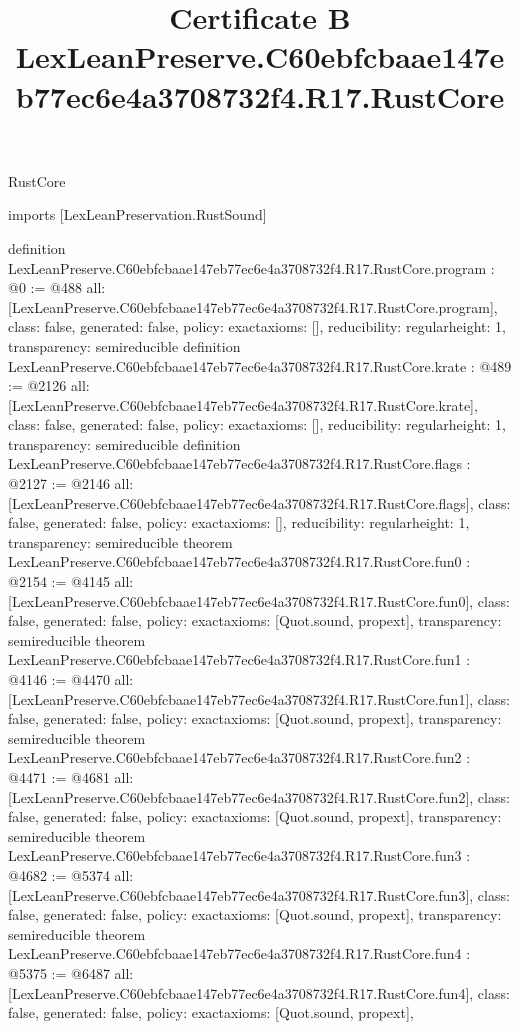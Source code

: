 \begin{lexlean}{RustCore}
\title{Certificate B LexLeanPreserve.C60ebfcbaae147eb77ec6e4a3708732f4.R17.RustCore}
\begin{coremodule}
imports [LexLeanPreservation.RustSound]

definition LexLeanPreserve.C60ebfcbaae147eb77ec6e4a3708732f4.R17.RustCore.program : @0 := @488 {
  all: [LexLeanPreserve.C60ebfcbaae147eb77ec6e4a3708732f4.R17.RustCore.program],
  class: false,
  generated: false,
  policy: exact{axioms: []},
  reducibility: regular{height: 1},
  transparency: semireducible
}
definition LexLeanPreserve.C60ebfcbaae147eb77ec6e4a3708732f4.R17.RustCore.krate : @489 := @2126 {
  all: [LexLeanPreserve.C60ebfcbaae147eb77ec6e4a3708732f4.R17.RustCore.krate],
  class: false,
  generated: false,
  policy: exact{axioms: []},
  reducibility: regular{height: 1},
  transparency: semireducible
}
definition LexLeanPreserve.C60ebfcbaae147eb77ec6e4a3708732f4.R17.RustCore.flags : @2127 := @2146 {
  all: [LexLeanPreserve.C60ebfcbaae147eb77ec6e4a3708732f4.R17.RustCore.flags],
  class: false,
  generated: false,
  policy: exact{axioms: []},
  reducibility: regular{height: 1},
  transparency: semireducible
}
theorem LexLeanPreserve.C60ebfcbaae147eb77ec6e4a3708732f4.R17.RustCore.fun0 : @2154 := @4145 {
  all: [LexLeanPreserve.C60ebfcbaae147eb77ec6e4a3708732f4.R17.RustCore.fun0],
  class: false,
  generated: false,
  policy: exact{axioms: [Quot.sound, propext]},
  transparency: semireducible
}
theorem LexLeanPreserve.C60ebfcbaae147eb77ec6e4a3708732f4.R17.RustCore.fun1 : @4146 := @4470 {
  all: [LexLeanPreserve.C60ebfcbaae147eb77ec6e4a3708732f4.R17.RustCore.fun1],
  class: false,
  generated: false,
  policy: exact{axioms: [Quot.sound, propext]},
  transparency: semireducible
}
theorem LexLeanPreserve.C60ebfcbaae147eb77ec6e4a3708732f4.R17.RustCore.fun2 : @4471 := @4681 {
  all: [LexLeanPreserve.C60ebfcbaae147eb77ec6e4a3708732f4.R17.RustCore.fun2],
  class: false,
  generated: false,
  policy: exact{axioms: [Quot.sound, propext]},
  transparency: semireducible
}
theorem LexLeanPreserve.C60ebfcbaae147eb77ec6e4a3708732f4.R17.RustCore.fun3 : @4682 := @5374 {
  all: [LexLeanPreserve.C60ebfcbaae147eb77ec6e4a3708732f4.R17.RustCore.fun3],
  class: false,
  generated: false,
  policy: exact{axioms: [Quot.sound, propext]},
  transparency: semireducible
}
theorem LexLeanPreserve.C60ebfcbaae147eb77ec6e4a3708732f4.R17.RustCore.fun4 : @5375 := @6487 {
  all: [LexLeanPreserve.C60ebfcbaae147eb77ec6e4a3708732f4.R17.RustCore.fun4],
  class: false,
  generated: false,
  policy: exact{axioms: [Quot.sound, propext]},
}
\end{coremodule}
\end{lexlean}
